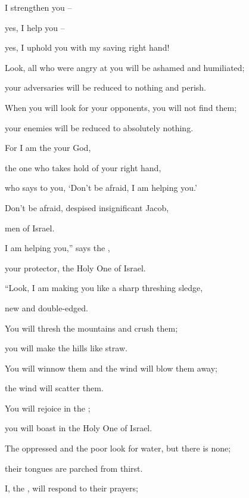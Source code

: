 {\par }{\Q I strengthen you –
\par }{\Q yes, I help you –
\par }{\Q yes, I uphold you with my saving right hand!
\par }{\Q {}Look,
all
who were angry
at you will be
ashamed
and humiliated;
\par }{\Q your adversaries
will be reduced to nothing
and perish.
\par }{\Q {}When you will look for
your opponents,
you will not
find
them;
\par }{\Q your enemies
will be
reduced to absolutely
nothing.
\par }{\Q {}For
I am
the
{}
your God,
\par }{\Q the one who takes hold
of your right hand,
\par }{\Q who says
to you, ‘Don’t
be afraid,
I am
helping you.’
\par }{\Q {}Don’t
be afraid,
despised insignificant
Jacob,
\par }{\Q men
of Israel.
\par }{\Q I
am helping
you,” says
the {},
\par }{\Q your protector,
the Holy One
of Israel.
\par }{\Q {}“Look,
I am making
you like a sharp
threshing sledge,
\par }{\Q new
and double-edged.
\par }{\Q You will thresh
the mountains
and crush
them;
\par }{\Q you will make
the hills
like straw.
\par }{\Q {}You will winnow
them and the wind
will blow them away;
\par }{\Q the wind
will scatter
them.
\par }{\Q You
will rejoice
in the
{};
\par }{\Q you will boast
in the Holy One
of Israel.
\par }{\Q {}The oppressed
and the poor
look
for water,
but there is none;
\par }{\Q their tongues
are parched
from thirst.
\par }{\Q I,
the {}, will respond
to their prayers;

}
